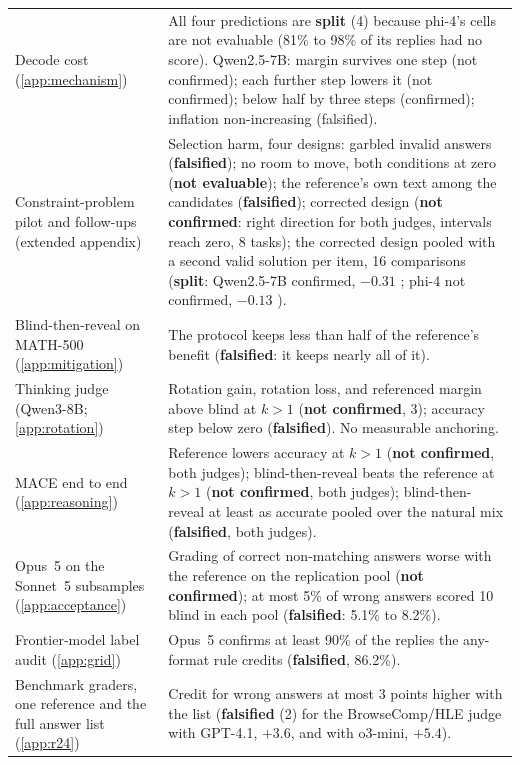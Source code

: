{\begin{longtable}{L{3.5cm}L{9.5cm}}
Decode cost (\cref{app:mechanism}) & All four predictions are \textbf{split} (4) because phi-4's cells are not evaluable (81\% to 98\% of its replies had no score). Qwen2.5-7B: margin survives one step (not confirmed); each further step lowers it (not confirmed); below half by three steps (confirmed); inflation non-increasing (falsified). \\
Constraint-problem pilot and follow-ups (extended appendix) & Selection harm, four designs: garbled invalid answers (\textbf{falsified}); no room to move, both conditions at zero (\textbf{not evaluable}); the reference's own text among the candidates (\textbf{falsified}); corrected design (\textbf{not confirmed}: right direction for both judges, intervals reach zero, 8 tasks); the corrected design pooled with a second valid solution per item, 16 comparisons (\textbf{split}: Qwen2.5-7B confirmed, $-0.31$ ; phi-4 not confirmed, $-0.13$ ). \\
Blind-then-reveal on MATH-500 (\cref{app:mitigation}) & The protocol keeps less than half of the reference's benefit (\textbf{falsified}: it keeps nearly all of it). \\
Thinking judge (Qwen3-8B; \cref{app:rotation}) & Rotation gain, rotation loss, and referenced margin above blind at $k{>}1$ (\textbf{not confirmed}, 3); accuracy step below zero (\textbf{falsified}). No measurable anchoring. \\
\textsc{MACE} end to end (\cref{app:reasoning}) & Reference lowers accuracy at $k{>}1$ (\textbf{not confirmed}, both judges); blind-then-reveal beats the reference at $k{>}1$ (\textbf{not confirmed}, both judges); blind-then-reveal at least as accurate pooled over the natural mix (\textbf{falsified}, both judges). \\
Opus~5 on the Sonnet~5 subsamples (\cref{app:acceptance}) & Grading of correct non-matching answers worse with the reference on the replication pool (\textbf{not confirmed}); at most 5\% of wrong answers scored 10 blind in each pool (\textbf{falsified}: 5.1\% to 8.2\%). \\
Frontier-model label audit (\cref{app:grid}) & Opus~5 confirms at least 90\% of the replies the any-format rule credits (\textbf{falsified}, 86.2\%). \\
Benchmark graders, one reference and the full answer list (\cref{app:r24}) & Credit for wrong answers at most 3 points higher with the list (\textbf{falsified} (2) for the BrowseComp/HLE judge with GPT-4.1, $+3.6$, and with o3-mini, $+5.4$). \\

\end{longtable}}
